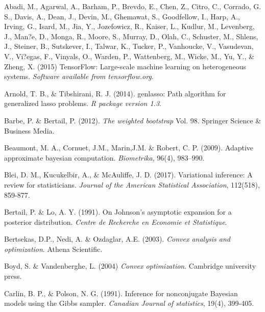 \documentclass[12pt]{TD-CJS}
\begin{document}
\begin{thebibliography}{}

Abadi, M., Agarwal, A., Barham, P., Brevdo, E., Chen, Z., Citro, C., Corrado, G. S., Davis, A., Dean, J., Devin, M., Ghemawat, S., Goodfellow, I., Harp, A., Irving, G., Isard, M., Jia, Y., Jozefowicz, R., Kaiser, L., Kudlur, M., Levenberg, J., Man?e, D., Monga, R., Moore, S., Murray, D., Olah, C., Schuster, M., Shlens, J., Steiner, B., Sutskever, I., Talwar, K., Tucker, P., Vanhoucke, V., Vasudevan, V., Vi?egas, F., Vinyals, O., Warden, P., Wattenberg, M., Wicke, M., Yu, Y., \& Zheng, X. (2015) TensorFlow: Large-scale machine learning on heterogeneous systems. {\it Software available from tensorflow.org}.

Arnold, T. B., \& Tibshirani, R. J. (2014). genlasso: Path algorithm for generalized lasso problems. {\it R package version 1.3}.

Barbe, P. \& Bertail, P. (2012). {\em The weighted bootstrap} Vol. 98. Springer Science \& Business Media.

Beaumont, M. A.,  Cornuet, J.M.,  Marin,J.M. \& Robert, C. P. (2009). Adaptive approximate bayesian computation. {\it Biometrika}, 96(4), 983--990.

Blei, D. M., Kucukelbir, A., \& McAuliffe, J. D. (2017). Variational inference: A review for statisticians. {\it Journal of the American Statistical Association}, 112(518), 859-877.

Bertail, P. \& Lo,  A. Y.  (1991). On Johnson's asymptotic expansion for a posterior distribution. {\it Centre de Recherche en Economie et Statistique}.

Bertsekas, D.P., Nedi, A. \& Ozdaglar, A.E. (2003). {\em Convex analysis and optimization}. Athena Scientific.

Boyd, S. \& Vandenberghe, L. (2004) {\it Convex optimization}. Cambridge university press.

Carlin, B. P., \& Polson, N. G. (1991). Inference for nonconjugate Bayesian models using the Gibbs sampler. {\it Canadian Journal of statistics}, 19(4), 399-405.


\end{thebibliography}
\end{document}
